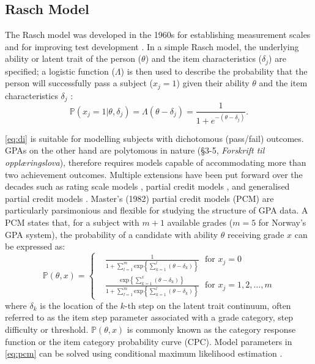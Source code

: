 \documentclass[
    a4paper,            %
    11pt,               %
    stu,                %
    donotrepeattitle,   %
    noextraspace,       %
    floatsintext,       %
    biblatex,           %
    colorlinks=true,        %
    linkcolor=red,          %
    anchorcolor=black,      %
    citecolor=blue,         %
    urlcolor=blue,          %
    bookmarks=true,         %
    bookmarksopen=false,    %
    bookmarksnumbered=true  %
]{apa7}
\newcommand{\p}[1]{\mathbb{P}\left(#1\right)}
\renewcommand{\exp}[1]{\mathrm{exp}\left\{#1\right\}}
\begin{document}
\subsection{Rasch Model}

The Rasch model was developed in the 1960s for establishing measurement scales and for improving test development \parencite{rasch:1980}. In a simple Rasch model, the underlying ability or latent trait of the person ($\theta$) and the item characteristics ($\delta_j$) are specified; a logistic function ($\Lambda$) is then used to describe the probability that the person will successfully pass a subject ($x_j=1$) given their ability $\theta$ and the item characteristics $\delta_j$ \parencite{deayala:2009}:
\begin{equation}\label{eq:di}
    \p{x_j = 1 | \theta, \delta_j} = \Lambda(\theta - \delta_j) = \frac{1}{1 + e^{- \left( \theta - \delta_j \right) } }.
\end{equation}

\cref{eq:di} is suitable for modelling subjects with dichotomous (pass/fail) outcomes. GPAs on the other hand are polytomous in nature (\S 3-5, \textit{Forskrift til oppl{\ae}ringslova}), therefore requires models capable of accommodating more than two achievement outcomes. Multiple extensions have been put forward over the decades such as rating scale models \parencite{rasch:1980}, partial credit models \parencite{masters:1982}, and generalised partial credit models \parencite{muraki:1992}. Master's (1982) partial credit models (PCM) are particularly parsimonious and flexible for studying the structure of GPA data. A PCM states that, for a subject with $m+1$ available grades ($m=5$ for Norway's GPA system), the probability of a candidate with ability $\theta$ receiving grade $x$ can be expressed as:
\begin{equation}\label{eq:pcm}
    \p{\theta, x}=
    \left\{
        \begin{aligned}
            &\frac{1}{1 + \sum_{l=1}^m \exp{ \sum_{k=1}^l (\theta - \delta_k) }}\ \ \ \text{for } x_j = 0\\
            &\frac{ \exp{ \sum_{k=1}^x (\theta - \delta_k) } }{1 + \sum_{l=1}^m \exp{ \sum_{k=1}^l (\theta - \delta_k) }}\ \ \ \text{for } x_j = 1,2,\dots,m
        \end{aligned}
    \right.
\end{equation}
where $\delta_k$ is the location of the $k$-th step on the latent trait continuum, often referred to as the item step parameter associated with a grade category, step difficulty or threshold. $\p{\theta, x}$ is commonly known as the category response function or the item category probability curve (CPC). Model parameters in \cref{eq:pcm} can be solved using conditional maximum likelihood estimation \parencite{andersen:1972}.
\end{document}
